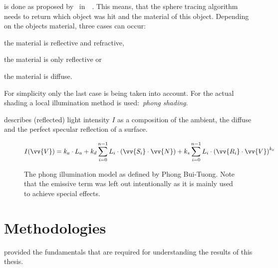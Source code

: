 \documentclass[%
    a4paper,    %
    justified,  %
    nobib,      %
    openany     %
]{tufte-book}
\begin{document}
 is done as proposed by~\citeauthor{whitted_improved_1980}
in~~\cite{whitted_improved_1980}. This means,
that the sphere tracing algorithm needs to return which object was hit and the
material of this object. Depending on the objects material, three cases can
occur:
\begin{enumerate*}
  \item the material is reflective and refractive,
  \item the material is only reflective or
  \item the material is diffuse.
\end{enumerate*}
For simplicity only the last case is being taken into account. For the actual
shading a local illumination method is used:~\textit{phong shading}.

 describes (reflected) light intensity
$I$ as a composition of the ambient, the diffuse and the perfect specular
reflection of a surface.

\begin{figure}
  \label{eq:phong-equation}
  \caption{The phong illumination model as defined by Phong Bui-Tuong. Note that
  the emissive term was left out intentionally as it is mainly used to achieve
  special effects.}
  \begin{equation}
    I(\vv{V}) = k_{a} \cdot L_{a} + k_{d} \displaystyle\sum_{i=0}^{n - 1} L_{i} \cdot (\vv{S_{i}} \cdot \vv{N}) + k_{s} \displaystyle\sum_{i=0}^{n - 1} L_{i} \cdot {(\vv{R_{i}} \cdot \vv{V})}^{k_{e}}
  \end{equation}
\end{figure}

\chapter{Methodologies}
\label{chap:methodologies}


 provided the fundamentals that are required for
understanding the results of this thesis.
\end{document}
